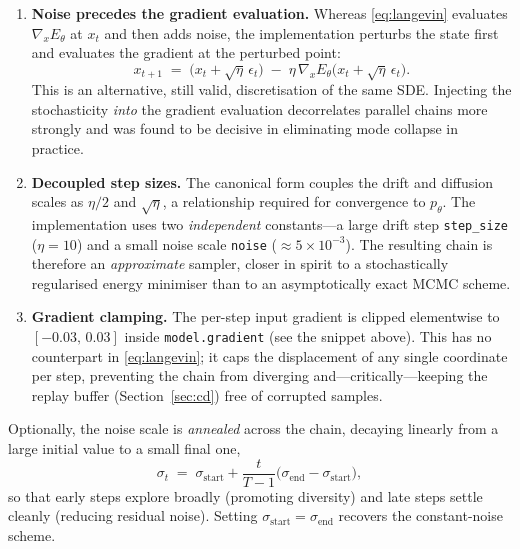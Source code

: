 \begin{enumerate}
  \item \textbf{Noise precedes the gradient evaluation.} Whereas \eqref{eq:langevin}
    evaluates $\nabla_x E_\theta$ at $x_t$ and then adds noise, the implementation perturbs
    the state first and evaluates the gradient at the perturbed point:
    \begin{equation}
      x_{t+1} \;=\; \bigl(x_t + \sqrt{\eta}\,\epsilon_t\bigr)
                     \;-\; \eta\,\nabla_x E_\theta\bigl(x_t + \sqrt{\eta}\,\epsilon_t\bigr).
      \label{eq:langevin-impl}
    \end{equation}
    This is an alternative, still valid, discretisation of the same SDE. Injecting the
    stochasticity \emph{into} the gradient evaluation decorrelates parallel chains more
    strongly and was found to be decisive in eliminating mode collapse in practice.

  \item \textbf{Decoupled step sizes.} The canonical form couples the drift and diffusion
    scales as $\eta/2$ and $\sqrt{\eta}$, a relationship required for convergence to
    $p_\theta$. The implementation uses two \emph{independent} constants---a large drift
    step \texttt{step\_size} ($\eta = 10$) and a small noise scale \texttt{noise}
    ($\approx 5\times10^{-3}$). The resulting chain is therefore an \emph{approximate}
    sampler, closer in spirit to a stochastically regularised energy minimiser than to an
    asymptotically exact MCMC scheme.

  \item \textbf{Gradient clamping.} The per-step input gradient is clipped elementwise to
    $[-0.03,\,0.03]$ inside \texttt{model.gradient} (see the snippet above). This has no
    counterpart in \eqref{eq:langevin}; it caps the displacement of any single coordinate
    per step, preventing the chain from diverging and---critically---keeping the replay
    buffer (Section~\ref{sec:cd}) free of corrupted samples.
\end{enumerate}

Optionally, the noise scale is \emph{annealed} across the chain, decaying linearly from a
large initial value to a small final one,
\begin{equation}
  \sigma_t \;=\; \sigma_{\mathrm{start}}
    + \frac{t}{T-1}\bigl(\sigma_{\mathrm{end}} - \sigma_{\mathrm{start}}\bigr),
  \label{eq:anneal}
\end{equation}
so that early steps explore broadly (promoting diversity) and late steps settle cleanly
(reducing residual noise). Setting $\sigma_{\mathrm{start}} = \sigma_{\mathrm{end}}$
recovers the constant-noise scheme.

